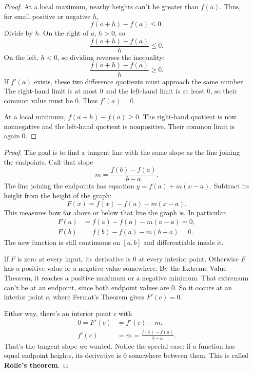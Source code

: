 \begin{proof}
At a local maximum, nearby heights can't be greater than $f(a)$. Thus,
for small positive or negative $h$,
$$f(a+h)-f(a)\leq0.$$
Divide by $h$. On the right of $a$, $h>0$, so
$$\frac{f(a+h)-f(a)}h\leq0.$$
On the left, $h<0$, so dividing reverses the inequality:
$$\frac{f(a+h)-f(a)}h\geq0.$$
If $f'(a)$ exists, these two difference quotients must approach the
same number. The right-hand limit is at most 0 and the left-hand limit
is at least 0, so their common value must be 0. Thus $f'(a)=0$.

At a local minimum, $f(a+h)-f(a)\geq0$. The right-hand quotient is now
nonnegative and the left-hand quotient is nonpositive. Their common
limit is again 0.
\end{proof}


\begin{proof}
The goal is to find a tangent line with the same slope as the line
joining the endpoints. Call that slope
$$m=\frac{f(b)-f(a)}{b-a}.$$
The line joining the endpoints has equation $y=f(a)+m(x-a)$. Subtract
its height from the height of the graph:
$$F(x)=f(x)-f(a)-m(x-a).$$
This measures how far above or below that line the graph is. In
particular,
\begin{align*}
F(a)&=f(a)-f(a)-m(a-a)=0,\\
F(b)&=f(b)-f(a)-m(b-a)=0.
\end{align*}
The new function is still continuous on $[a,b]$ and differentiable
inside it.

If $F$ is zero at every input, its derivative is 0 at every interior point.
Otherwise $F$ has a positive value or a negative value somewhere. By
the Extreme Value Theorem, it reaches a positive maximum or a negative
minimum. That extremum can't be at an endpoint, since both endpoint
values are 0. So it occurs at an interior point $c$, where Fermat's
Theorem gives $F'(c)=0$.

Either way, there's an interior point $c$ with
\begin{align*}
0=F'(c)&=f'(c)-m,\\
f'(c)&=m=\frac{f(b)-f(a)}{b-a}.
\end{align*}
That's the tangent slope we wanted. Notice the special case: if a
function has equal endpoint heights, its derivative is 0 somewhere
between them. This is called \textbf{Rolle's theorem}.
\end{proof}

